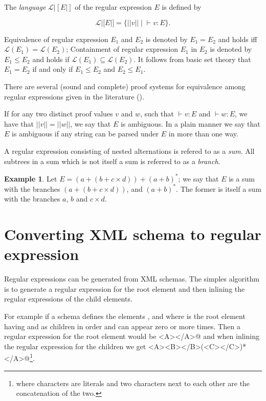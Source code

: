 \documentclass[a4paper, oneside]{memoir}
\theoremstyle{definition}
\newtheorem{example}{Example}
\begin{document}
The \emph{language} $\mathcal{L} |[E|]$ of the regular expression $E$ is defined by

\[
\mathcal{L}|[E|] = \lbrace ||v|| \; | \; \vdash v : E \rbrace.
\]

Equivalence of regular expression $E_1$ and $E_2$ is denoted by $E_1 = E_2$ and
holds iff $\mathcal{L}(E_1) = \mathcal{L}(E_2)$; Containment of regular
expression $E_1$ in $E_2$ is denoted by $E_1 \le E_2$ and holds if
$\mathcal{L}(E_1) \subseteq \mathcal{L}(E_2)$.  It follows from basic set theory
that $E_1 = E_2$ if and only if $E_1 \le E_2$ and $E_2 \le E_1$.

There are several (sound and complete) proof systems for equivalence among
regular expressions given in the literature (\cite{salomaa1966, kozen1994,
  grabmayer2005, heni2010}).

If for any two distinct proof values $v$ and $w$, such that $\vdash v : E$ and
$\vdash w : E$, we have that $||v|| = ||w||$, we say that $E$ is ambiguous. In a
plain manner we say that $E$ is ambiguous if any string can be parsed under $E$
in more than one way.

A regular expression consisting of nested alternations is refered to as a \emph{sum}.
All subtrees in a sum which is not itself a sum is referred to as a \emph{branch}.

\begin{example}
Let $E = (a + (b + c \times d)) + (a + b)^{*}$; we say that $E$ is a sum with
the branches $(a + (b + c \times d))$, and $(a + b)^{\ast}$. The former is
itself a sum with the branches $a$, $b$ and $c \times d$.
\end{example}

\chapter{Converting XML schema to regular expression}
\label{chap:convert}

Regular expressions can be generated from XML schemas. The simples algorithm is
to generate a regular expression for the root element and then inlining the
regular expressions of the child elements.

For example if a schema defines the elements \verb@A@, \verb@B@ and \verb@C@
where \verb@A@ is the root element having \verb@B@ and \verb@C@ as children in
order and \verb@C@ can appear zero or more times. Then a regular expression for
the root element would be \verb@<A></A>@ and when inlining the regular
expression for the children we get
\verb@<A><B></B>(<C></C>)*</A>@\footnote{where characters are literals and two
  characters next to each other are the concatenation of the two.}.
\end{document}
